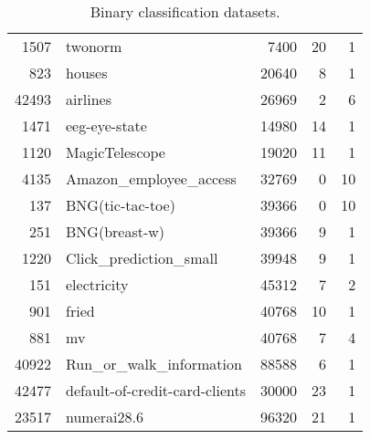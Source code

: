 \begin{table}
\begin{tabular}{rlrrr}
      1507 &                        twonorm &         7400 &               20 &                1 \\
       823 &                         houses &        20640 &                8 &                1 \\
     42493 &                       airlines &        26969 &                2 &                6 \\
      1471 &                  eeg-eye-state &        14980 &               14 &                1 \\
      1120 &                 MagicTelescope &        19020 &               11 &                1 \\
      4135 &         Amazon\_employee\_access &        32769 &                0 &               10 \\
       137 &               BNG(tic-tac-toe) &        39366 &                0 &               10 \\
       251 &                  BNG(breast-w) &        39366 &                9 &                1 \\
      1220 &         Click\_prediction\_small &        39948 &                9 &                1 \\
       151 &                    electricity &        45312 &                7 &                2 \\
       901 &                          fried &        40768 &               10 &                1 \\
       881 &                             mv &        40768 &                7 &                4 \\
     40922 &        Run\_or\_walk\_information &        88588 &                6 &                1 \\
     42477 & default-of-credit-card-clients &        30000 &               23 &                1 \\
     23517 &                    numerai28.6 &        96320 &               21 &                1 \\
\bottomrule
\end{tabular}
\caption{Binary classification datasets.}
\label{tab:binary_data}
\end{table}
